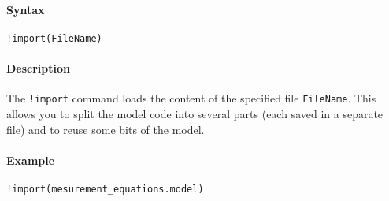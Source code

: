 


	\paragraph{Syntax}\label{syntax}

\begin{verbatim}
!import(FileName)
\end{verbatim}

\paragraph{Description}\label{description}

The \texttt{!import} command loads the content of the specified file
\texttt{FileName}. This allows you to split the model code into several
parts (each saved in a separate file) and to reuse some bits of the
model.

\paragraph{Example}\label{example}

\begin{verbatim}
!import(mesurement_equations.model)
\end{verbatim}


